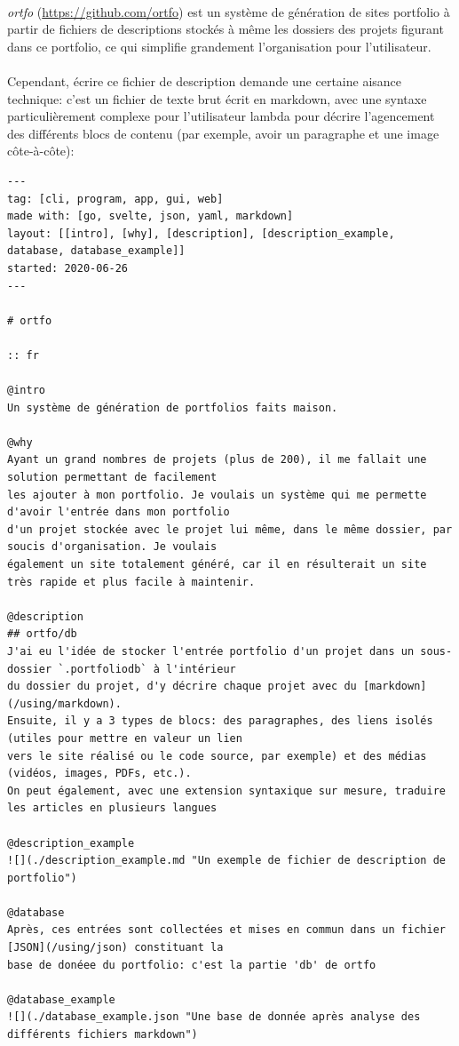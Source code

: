 \documentclass{article}
\begin{document}
    \paragraph{}
    
    \emph{ortfo}  (\url{https://github.com/ortfo}) est un système de génération de sites portfolio à partir de
fichiers de descriptions stockés à même les dossiers des projets figurant dans ce portfolio, ce qui
simplifie grandement l’organisation pour l’utilisateur.

\paragraph{}

Cependant, écrire ce fichier de description demande une certaine aisance technique: c’est
un fichier de texte brut écrit en markdown, avec une syntaxe particulièrement complexe pour
l’utilisateur lambda pour décrire l’agencement des différents blocs de contenu (par exemple, avoir
un paragraphe et une image côte-à-côte):

    \begin{verbatim}
---
tag: [cli, program, app, gui, web]
made with: [go, svelte, json, yaml, markdown]
layout: [[intro], [why], [description], [description_example, database, database_example]]
started: 2020-06-26
---

# ortfo

:: fr

@intro
Un système de génération de portfolios faits maison.

@why
Ayant un grand nombres de projets (plus de 200), il me fallait une solution permettant de facilement 
les ajouter à mon portfolio. Je voulais un système qui me permette d'avoir l'entrée dans mon portfolio 
d'un projet stockée avec le projet lui même, dans le même dossier, par soucis d'organisation. Je voulais 
également un site totalement généré, car il en résulterait un site très rapide et plus facile à maintenir.

@description
## ortfo/db
J'ai eu l'idée de stocker l'entrée portfolio d'un projet dans un sous-dossier `.portfoliodb` à l'intérieur 
du dossier du projet, d'y décrire chaque projet avec du [markdown](/using/markdown).
Ensuite, il y a 3 types de blocs: des paragraphes, des liens isolés (utiles pour mettre en valeur un lien 
vers le site réalisé ou le code source, par exemple) et des médias (vidéos, images, PDFs, etc.).
On peut également, avec une extension syntaxique sur mesure, traduire les articles en plusieurs langues

@description_example
![](./description_example.md "Un exemple de fichier de description de portfolio")

@database
Après, ces entrées sont collectées et mises en commun dans un fichier [JSON](/using/json) constituant la 
base de donéee du portfolio: c'est la partie 'db' de ortfo

@database_example
![](./database_example.json "Une base de donnée après analyse des différents fichiers markdown")
    \end{verbatim}
\end{document}
